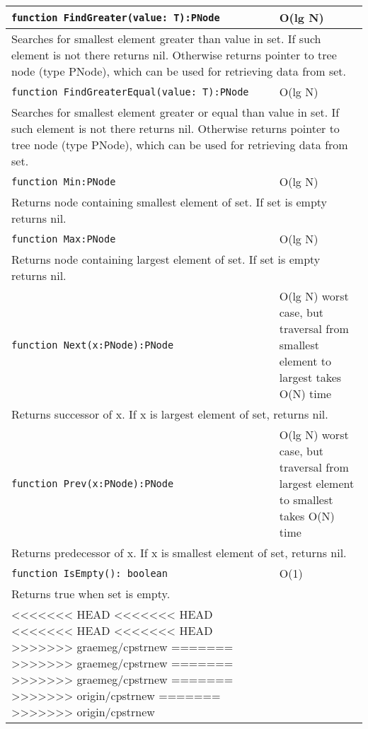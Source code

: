 \begin{longtable}{|m{10cm}|m{5cm}|}
\verb!function FindGreater(value: T):PNode! & O(lg N) \\\hline
\multicolumn{2}{|m{15cm}|}{Searches for smallest element greater than value in set. If such element is not there returns nil. Otherwise
returns pointer to tree node (type PNode), which can be used for retrieving data from set.} \\\hline\hline

\verb!function FindGreaterEqual(value: T):PNode! & O(lg N) \\\hline
\multicolumn{2}{|m{15cm}|}{Searches for smallest element greater or equal than value in set. If such element is not there returns nil. Otherwise
returns pointer to tree node (type PNode), which can be used for retrieving data from set.} \\\hline\hline

\verb!function Min:PNode! & O(lg N) \\\hline
\multicolumn{2}{|m{15cm}|}{Returns node containing smallest element of set. If set is empty returns
nil.} \\\hline\hline

\verb!function Max:PNode! & O(lg N) \\\hline
\multicolumn{2}{|m{15cm}|}{Returns node containing largest element of set. If set is empty returns
nil.} \\\hline\hline

\verb!function Next(x:PNode):PNode! & O(lg N) worst case, but traversal from smallest element to
largest takes O(N) time \\\hline
\multicolumn{2}{|m{15cm}|}{Returns successor of x. If x is largest element of set, returns nil.} \\\hline\hline

\verb!function Prev(x:PNode):PNode! & O(lg N) worst case, but traversal from largest element to
smallest takes O(N) time \\\hline
\multicolumn{2}{|m{15cm}|}{Returns predecessor of x. If x is smallest element of set, returns nil.} \\\hline\hline

\verb!function IsEmpty(): boolean! & O(1) \\ \hline
\multicolumn{2}{|m{15cm}|}{Returns true when set is empty.} \\\hline
<<<<<<< HEAD
<<<<<<< HEAD
<<<<<<< HEAD
<<<<<<< HEAD
>>>>>>> graemeg/cpstrnew
=======
>>>>>>> graemeg/cpstrnew
=======
>>>>>>> graemeg/cpstrnew
=======
>>>>>>> origin/cpstrnew
=======
>>>>>>> origin/cpstrnew

\end{longtable}
